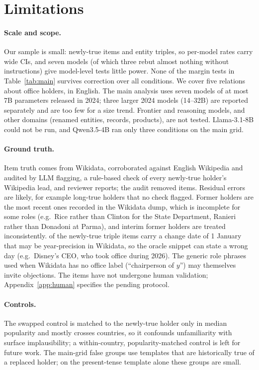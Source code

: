 \section*{Limitations}
\paragraph{Scale and scope.}
Our sample is small: \WNGNew{} newly-true items and \WNTri{} entity triples, so per-model rates carry wide CIs, and seven models (of which three rebut almost nothing without instructions) give model-level tests little power. None of the margin tests in Table~\ref{tab:main} survives correction over all conditions. We cover five relations about office holders, in English. The main analysis uses seven models of at most 7B parameters released in 2024; three larger 2024 models (14--32B) are reported separately and are too few for a size trend. Frontier and reasoning models, and other domains (renamed entities, records, products), are not tested. Llama-3.1-8B could not be run, and Qwen3.5-4B ran only three conditions on the main grid.

\paragraph{Ground truth.}
Item truth comes from Wikidata, corroborated against English Wikipedia and audited by LLM flagging, a rule-based check of every newly-true holder's Wikipedia lead, and reviewer reports; the audit removed \VNExcl{} items. Residual errors are likely, for example long-true holders that no check flagged. Former holders are the most recent ones recorded in the Wikidata dump, which is incomplete for some roles (e.g.\ Rice rather than Clinton for the State Department, Ranieri rather than Donadoni at Parma), and interim former holders are treated inconsistently. \WJanTri{} of the newly-true triple items carry a change date of 1 January that may be year-precision in Wikidata, so the oracle snippet can state a wrong day (e.g.\ Disney's CEO, who took office during 2026). The generic role phrases used when Wikidata has no office label (``chairperson of $y$'') may themselves invite objections. The items have not undergone human validation; Appendix~\ref{app:human} specifies the pending protocol.

\paragraph{Controls.}
The swapped control is matched to the newly-true holder only in median popularity and mostly crosses countries, so it confounds unfamiliarity with surface implausibility; a within-country, popularity-matched control is left for future work. The main-grid false groups use templates that are historically true of a replaced holder; on the present-tense template alone these groups are small.

